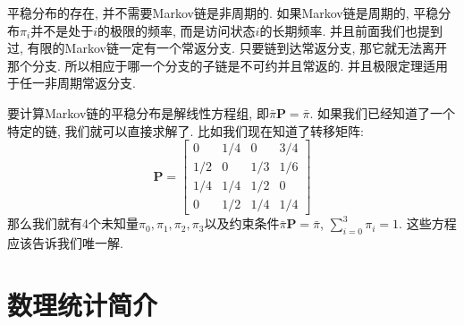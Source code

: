 \begin{remark}
    平稳分布的存在, 并不需要Markov链是非周期的. 如果Markov链是周期的, 平稳分布$\pi_i$并不是处于$i$的极限的频率, 而是访问状态$i$的长期频率. 并且前面我们也提到过, 有限的Markov链一定有一个常返分支. 只要链到达常返分支, 那它就无法离开那个分支. 所以相应于哪一个分支的子链是不可约并且常返的. 并且极限定理适用于任一非周期常返分支. 
\end{remark}

要计算Markov链的平稳分布是解线性方程组, 即$\bar{\pi} \mathbf{P}=\bar{\pi}$. 如果我们已经知道了一个特定的链, 我们就可以直接求解了. 比如我们现在知道了转移矩阵: 
$$
\mathbf{P}=\left[\begin{array}{cccc}
0 & 1 / 4 & 0 & 3 / 4 \\
1 / 2 & 0 & 1 / 3 & 1 / 6 \\
1 / 4 & 1 / 4 & 1 / 2 & 0 \\
0 & 1 / 2 & 1 / 4 & 1 / 4
\end{array}\right]
$$
那么我们就有4个未知量$\pi_0, \pi_1, \pi_2, \pi_3$以及约束条件$\bar{\pi} \mathbf{P}=\bar{\pi}$, $\sum_{i=0}^3 \pi_i=1$. 这些方程应该告诉我们唯一解. 



\part{数理统计简介}










